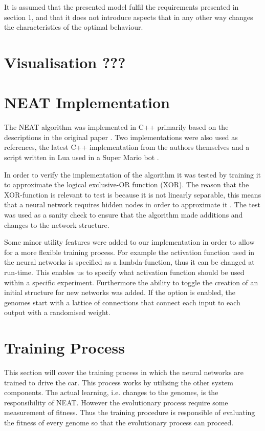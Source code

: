 It is assumed that the presented model fulfil the requirements presented in section 1, and that it does not introduce aspects that in any other way changes the characteristics of the optimal behaviour.

\section{Visualisation ???}

\section{NEAT Implementation}

The NEAT algorithm was implemented in C++ primarily based on the descriptions in the original paper \cite{stanley:neat}. Two implementations were also used as references, the latest C++ implementation from the authors themselves \cite{neat_source} and a script written in Lua used in a Super Mario bot \cite{mario_source}. 

In order to verify the implementation of the algorithm it was tested by training it to approximate the logical exclusive-OR function (XOR). The reason that the XOR-function is relevant to test is because it is not linearly separable, this means that a neural network requires  hidden nodes  in order to approximate it \cite{haykin:xor, stanley:neat}. The test was used as a sanity check to ensure that the algorithm made additions and changes to the network structure. 

Some minor utility features were added to our implementation in order to allow for a more flexible training process. For example the activation function used in the neural networks is specified as a lambda-function, thus it can be changed at run-time. This enables us to specify what activation function should be used within a specific experiment. Furthermore the ability to toggle the creation of an initial structure for new networks was added. If the option is enabled, the genomes start with a lattice of connections that connect each input to each output with a randomised weight. 


\section{Training Process}
This section will cover the training process in which the neural networks are trained to drive the car. This process works by utilising the other system components. The actual learning, i.e. changes to the genomes, is the responsibility of NEAT. However the evolutionary process require some measurement of fitness. Thus the training procedure is responsible of evaluating the fitness of every genome so that the evolutionary process can proceed. 

